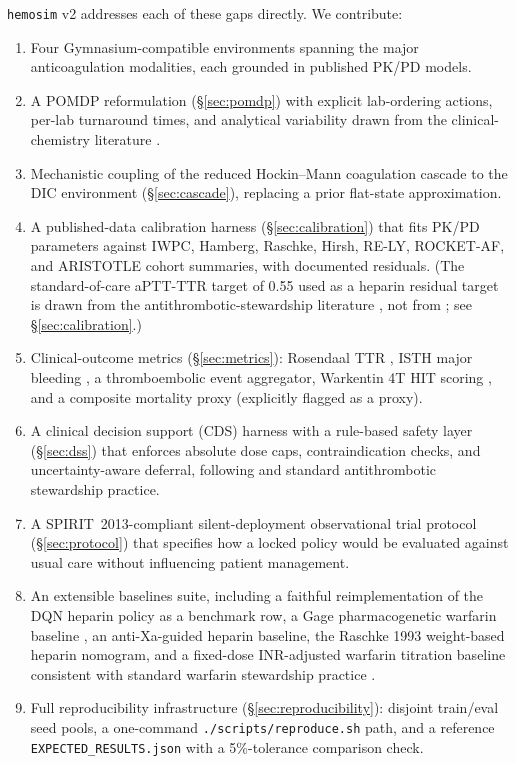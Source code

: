 \documentclass[11pt]{article}
\begin{document}
\texttt{hemosim} v2 addresses each of these gaps directly. We contribute:
\begin{enumerate}
  \item Four Gymnasium-compatible environments spanning the major anticoagulation modalities, each grounded in published PK/PD models.
  \item A POMDP reformulation (\S\ref{sec:pomdp}) with explicit lab-ordering actions, per-lab turnaround times, and analytical variability drawn from the clinical-chemistry literature \citep{bowen2016, lippi2012, whitehead2020}.
  \item Mechanistic coupling of the reduced Hockin--Mann coagulation cascade \citep{hockin2002} to the DIC environment (\S\ref{sec:cascade}), replacing a prior flat-state approximation.
  \item A published-data calibration harness (\S\ref{sec:calibration}) that fits PK/PD parameters against IWPC, Hamberg, Raschke, Hirsh, RE-LY, ROCKET-AF, and ARISTOTLE cohort summaries, with documented residuals. (The standard-of-care aPTT-TTR target of 0.55 used as a heparin residual target is drawn from the antithrombotic-stewardship literature \citep{wan2008}, not from \citet{nemati2016}; see \S\ref{sec:calibration}.)
  \item Clinical-outcome metrics (\S\ref{sec:metrics}): Rosendaal TTR \citep{rosendaal1993}, ISTH major bleeding \citep{schulman2005iostroke}, a thromboembolic event aggregator, Warkentin 4T HIT scoring \citep{warkentin2003, lo2006}, and a composite mortality proxy (explicitly flagged as a proxy).
  \item A clinical decision support (CDS) harness with a rule-based safety layer (\S\ref{sec:dss}) that enforces absolute dose caps, contraindication checks, and uncertainty-aware deferral, following \citet{holbrook2012} and standard antithrombotic stewardship practice.
  \item A SPIRIT~2013-compliant silent-deployment observational trial protocol (\S\ref{sec:protocol}) that specifies how a locked policy would be evaluated against usual care without influencing patient management.
  \item An extensible baselines suite, including a faithful reimplementation of the \citet{nemati2016} DQN heparin policy as a benchmark row, a Gage pharmacogenetic warfarin baseline \citep{gage2008}, an anti-Xa-guided heparin baseline, the Raschke 1993 weight-based heparin nomogram, and a fixed-dose INR-adjusted warfarin titration baseline consistent with standard warfarin stewardship practice \citep{holbrook2012}.
  \item Full reproducibility infrastructure (\S\ref{sec:reproducibility}): disjoint train/eval seed pools, a one-command \texttt{./scripts/reproduce.sh} path, and a reference \texttt{EXPECTED\_RESULTS.json} with a 5\%-tolerance comparison check.
\end{enumerate}
\end{document}
